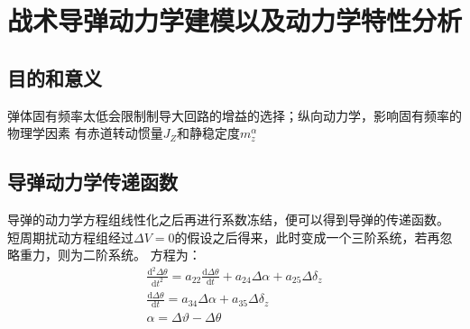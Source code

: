 \chapter{战术导弹动力学建模以及动力学特性分析}
\section{目的和意义}
弹体固有频率太低会限制制导大回路的增益的选择；纵向动力学，影响固有频率的物理学因素
有赤道转动惯量$J_Z$和静稳定度$m_z^{\alpha}$

\section{导弹动力学传递函数}
导弹的动力学方程组线性化之后再进行系数冻结，便可以得到导弹的传递函数。
短周期扰动方程组经过$\Delta V=0$的假设之后得来，此时变成一个三阶系统，若再忽略重力，则为二阶系统。
方程为：
\begin{equation}
    \begin{array}{l}
    \frac{\mathrm{d}^{2} \Delta\theta}{\mathrm{d} t^2} = 
    a_{22}\frac{\mathrm{d}\Delta\theta}{\mathrm{d} t} +
    a_{24}\Delta\alpha+a_{25}\Delta\delta_z \\
    \frac{\mathrm{d}\Delta\theta}{\mathrm{d} t} = a_{34}\Delta\alpha+
    a_{35}\Delta\delta_z \\
    \alpha = \Delta\vartheta -\Delta\theta
    \end{array}
    \label{short_per}
\end{equation}
